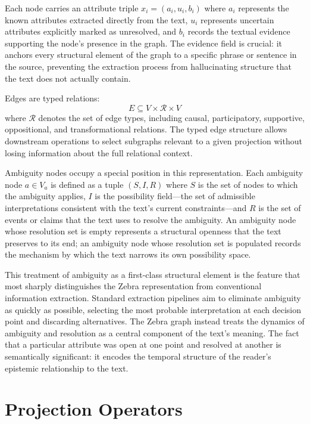 \documentclass[12pt,a4paper]{article}
\begin{document}
Each node carries an attribute triple $x_i = (a_i, u_i, b_i)$ where $a_i$ represents the known attributes extracted directly from the text, $u_i$ represents uncertain attributes explicitly marked as unresolved, and $b_i$ records the textual evidence supporting the node's presence in the graph. The evidence field is crucial: it anchors every structural element of the graph to a specific phrase or sentence in the source, preventing the extraction process from hallucinating structure that the text does not actually contain.

Edges are typed relations:
\[
E \subseteq V \times \mathcal{R} \times V
\]
where $\mathcal{R}$ denotes the set of edge types, including causal, participatory, supportive, oppositional, and transformational relations. The typed edge structure allows downstream operations to select subgraphs relevant to a given projection without losing information about the full relational context.

Ambiguity nodes occupy a special position in this representation. Each ambiguity node $a \in V_a$ is defined as a tuple $(S, I, R)$ where $S$ is the set of nodes to which the ambiguity applies, $I$ is the possibility field—the set of admissible interpretations consistent with the text's current constraints—and $R$ is the set of events or claims that the text uses to resolve the ambiguity. An ambiguity node whose resolution set is empty represents a structural openness that the text preserves to its end; an ambiguity node whose resolution set is populated records the mechanism by which the text narrows its own possibility space.

This treatment of ambiguity as a first-class structural element is the feature that most sharply distinguishes the Zebra representation from conventional information extraction. Standard extraction pipelines aim to eliminate ambiguity as quickly as possible, selecting the most probable interpretation at each decision point and discarding alternatives. The Zebra graph instead treats the dynamics of ambiguity and resolution as a central component of the text's meaning. The fact that a particular attribute was open at one point and resolved at another is semantically significant: it encodes the temporal structure of the reader's epistemic relationship to the text.

\section{Projection Operators}
\end{document}
